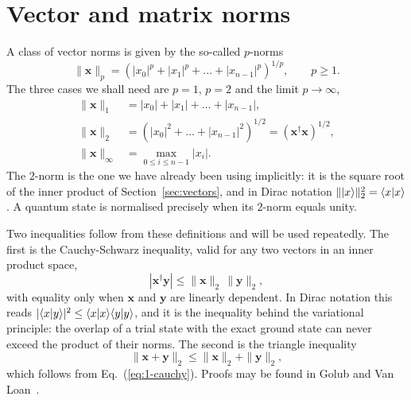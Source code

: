 \section{Vector and matrix norms}
\label{sec:norms}

A class of vector norms is given by the so-called $p$-norms
\begin{equation}
  \|\bm{x}\|_p =
    \left(|x_0|^p+|x_1|^p+\dots+|x_{n-1}|^p\right)^{1/p},
  \qquad p\ge 1 .
  \label{eq:1-pnorm}
\end{equation}
The three cases we shall need are $p=1$, $p=2$ and the limit
$p\rightarrow\infty$,
\begin{align}
  \|\bm{x}\|_1 &= |x_0|+|x_1|+\dots+|x_{n-1}|,
  \label{eq:1-norm1}\\
  \|\bm{x}\|_2 &=
     \left(|x_0|^2+\dots+|x_{n-1}|^2\right)^{1/2}
     =\left(\bm{x}^{\dagger}\bm{x}\right)^{1/2},
  \label{eq:1-norm2}\\
  \|\bm{x}\|_{\infty} &= \max_{0\le i\le n-1} |x_i| .
  \label{eq:1-norminf}
\end{align}
The $2$-norm is the one we have already been using implicitly: it is the
square root of the inner product of Section~\ref{sec:vectors}, and in Dirac
notation $\|\vert x \rangle\|_2^2=\langle x \vert x \rangle$.  A quantum state is normalised
precisely when its $2$-norm equals unity.

Two inequalities follow from these definitions and will be used repeatedly.
The first is the Cauchy-Schwarz inequality, valid for any two vectors in an
inner product space,
\begin{equation}
  \left|\bm{x}^{\dagger}\bm{y}\right| \le
     \|\bm{x}\|_2\,\|\bm{y}\|_2 ,
  \label{eq:1-cauchy}
\end{equation}
with equality only when $\bm{x}$ and $\bm{y}$ are linearly dependent.  In
Dirac notation this reads $|\langle x \vert y \rangle|^2\le\langle x \vert x \rangle\langle y \vert y \rangle$,
and it is the inequality behind the variational principle: the overlap of a
trial state with the exact ground state can never exceed the product of their
norms.  The second is the triangle inequality
\begin{equation}
  \|\bm{x}+\bm{y}\|_2 \le \|\bm{x}\|_2 + \|\bm{y}\|_2 ,
  \label{eq:1-triangle}
\end{equation}
which follows from Eq.~(\ref{eq:1-cauchy}).  Proofs may be found in Golub and
Van Loan~\cite{golub1996}.

